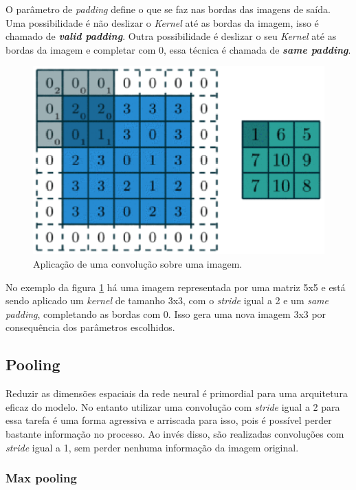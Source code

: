 O parâmetro de \textit{padding}\cite{Dumoulin2016} define o que se faz
nas bordas das imagens de saída. Uma possibilidade é não deslizar o
\textit{Kernel} até as bordas da imagem, isso é chamado de {\bf
  \emph{valid padding}}. Outra possibilidade é deslizar o seu
\textit{Kernel} até as bordas da imagem e completar com 0, essa
técnica é chamada de {\bf \emph{same padding}}.

\begin{figure}[H]
\centering
\includegraphics[scale=0.6]{imagens/conv_kernel_pad_stride.eps}
\caption{Aplicação de uma convolução sobre uma
  imagem.\cite{Dumoulin2016}}
\label{fig:conv_kernel_pad_stride}
\end{figure}

No exemplo da figura \ref{fig:conv_kernel_pad_stride} há uma imagem
representada por uma matriz 5x5 e está sendo aplicado um
\textit{kernel} de tamanho 3x3, com o \textit{stride} igual a 2 e um
\textit{same padding}, completando as bordas com 0. Isso gera uma nova
imagem 3x3 por consequência dos parâmetros escolhidos.

\subsection{Pooling}

Reduzir as dimensões espaciais da rede neural é primordial para
uma arquitetura eficaz do modelo. No entanto utilizar uma convolução
com \textit{stride} igual a 2 para essa tarefa é uma forma agressiva e
arriscada para isso, pois é possível perder bastante informação no
processo. Ao invés disso, são realizadas convoluções com
\textit{stride} igual a 1, sem perder nenhuma informação da imagem
original.

\subsubsection{Max pooling}

